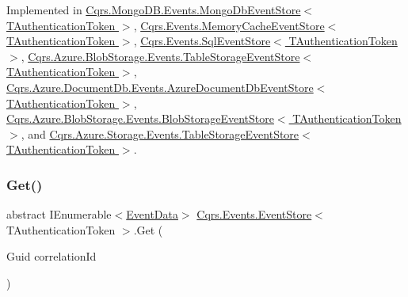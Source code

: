Implemented in \hyperlink{classCqrs_1_1MongoDB_1_1Events_1_1MongoDbEventStore_a7a1ac8e59dc5bff0bb6562fb4f43e8df_a7a1ac8e59dc5bff0bb6562fb4f43e8df}{Cqrs.\+Mongo\+D\+B.\+Events.\+Mongo\+Db\+Event\+Store$<$ T\+Authentication\+Token $>$}, \hyperlink{classCqrs_1_1Events_1_1MemoryCacheEventStore_a1391c260f52f5cf18058cf88ad2d16de_a1391c260f52f5cf18058cf88ad2d16de}{Cqrs.\+Events.\+Memory\+Cache\+Event\+Store$<$ T\+Authentication\+Token $>$}, \hyperlink{classCqrs_1_1Events_1_1SqlEventStore_a7e32a08a015642a5bc1cefa6998e6f11_a7e32a08a015642a5bc1cefa6998e6f11}{Cqrs.\+Events.\+Sql\+Event\+Store$<$ T\+Authentication\+Token $>$}, \hyperlink{classCqrs_1_1Azure_1_1BlobStorage_1_1Events_1_1TableStorageEventStore_a420c94c86d8d1c2959aee8602f43c0c0_a420c94c86d8d1c2959aee8602f43c0c0}{Cqrs.\+Azure.\+Blob\+Storage.\+Events.\+Table\+Storage\+Event\+Store$<$ T\+Authentication\+Token $>$}, \hyperlink{classCqrs_1_1Azure_1_1DocumentDb_1_1Events_1_1AzureDocumentDbEventStore_a54f298fdde141166e23f01e4911bf188_a54f298fdde141166e23f01e4911bf188}{Cqrs.\+Azure.\+Document\+Db.\+Events.\+Azure\+Document\+Db\+Event\+Store$<$ T\+Authentication\+Token $>$}, \hyperlink{classCqrs_1_1Azure_1_1BlobStorage_1_1Events_1_1BlobStorageEventStore_ab68b594c54ae5a79e3b8d5db1902752d_ab68b594c54ae5a79e3b8d5db1902752d}{Cqrs.\+Azure.\+Blob\+Storage.\+Events.\+Blob\+Storage\+Event\+Store$<$ T\+Authentication\+Token $>$}, and \hyperlink{classCqrs_1_1Azure_1_1Storage_1_1Events_1_1TableStorageEventStore_a089514182da7a70f35f9237c521c49f0_a089514182da7a70f35f9237c521c49f0}{Cqrs.\+Azure.\+Storage.\+Events.\+Table\+Storage\+Event\+Store$<$ T\+Authentication\+Token $>$}.

\mbox{\label{classCqrs_1_1Events_1_1EventStore_a0096646f5dff730b0041b9469719c420_a0096646f5dff730b0041b9469719c420}} 
\subsubsection{\texorpdfstring{Get()}{Get()}\hspace{0.1cm}{\footnotesize\ttfamily [2/2]}}
{\footnotesize\ttfamily abstract I\+Enumerable$<$\hyperlink{classCqrs_1_1Events_1_1EventData}{Event\+Data}$>$ \hyperlink{classCqrs_1_1Events_1_1EventStore}{Cqrs.\+Events.\+Event\+Store}$<$ T\+Authentication\+Token $>$.Get (\begin{DoxyParamCaption}\item[{Guid}]{correlation\+Id }\end{DoxyParamCaption})\hspace{0.3cm}{\ttfamily [pure virtual]}}



